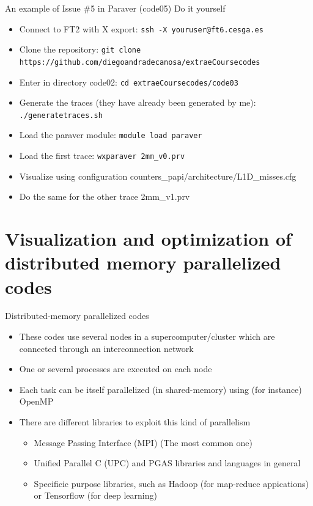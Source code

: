 \documentclass[10pt,xcolor=table]{beamer}
\begin{document}
\begin{frame}{An example of Issue \#5 in Paraver (code05)}
Do it yourself
\begin{itemize}
    \item Connect to FT2 with X export: {\tt ssh -X youruser@ft6.cesga.es}
    \item Clone the repository: {\tt git clone https://github.com/diegoandradecanosa/extraeCoursecodes}
    \item Enter in directory code02: {\tt cd extraeCoursecodes/code03}
    \item Generate the traces (they have already been generated by me): {\tt ./generatetraces.sh}
    \item Load the paraver module:  {\tt module load paraver}
    \item Load the first trace: {\tt wxparaver 2mm\_v0.prv}
    \item Visualize using configuration counters\_papi/architecture/L1D\_misses.cfg
    \item Do the same for the other trace 2mm\_v1.prv
\end{itemize}
\end{frame}




\section{Visualization and optimization of distributed memory parallelized codes}


\begin{frame}{Distributed-memory parallelized codes}
\begin{itemize}
    \item These codes use several nodes in a supercomputer/cluster which are connected through an interconnection network
    \item One or several processes are executed on each node
    \item Each task can be itself parallelized (in shared-memory) using (for instance) OpenMP
    \item There are different libraries to exploit this kind of parallelism
        \begin{itemize}
            \item Message Passing Interface (MPI) (The most common one) 
            \item Unified Parallel C (UPC) and PGAS libraries and languages in general
            \item Specificic purpose libraries, such as Hadoop (for map-reduce appications) or Tensorflow (for deep learning) 
        \end{itemize}
\end{itemize}
\end{frame}
\end{document}
